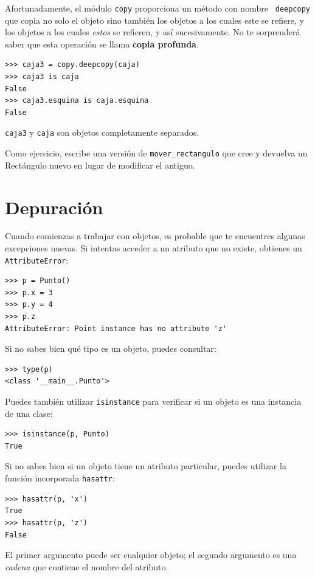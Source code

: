 \documentclass[10pt]{book}
\begin{document}
Afortunadamente, el módulo {\tt copy} proporciona un método con nombre {\tt
deepcopy} que copia no solo el objeto sino también
los objetos a los cuales este se refiere, y los objetos a los cuales {\em estos} se refieren,
y así sucesivamente.
No te sorprenderá saber que esta operación se
llama {\bf copia profunda}.

\begin{verbatim}
>>> caja3 = copy.deepcopy(caja)
>>> caja3 is caja
False
>>> caja3.esquina is caja.esquina
False
\end{verbatim}
%
{\tt caja3} y {\tt caja} son objetos completamente separados.

Como ejercicio, escribe una versión de \verb"mover_rectangulo" que cree y
devuelva un Rectángulo nuevo en lugar de modificar el antiguo.


\section{Depuración}
\label{hasattr}

Cuando comienzas a trabajar con objetos, es probable que te encuentres
algunas excepciones nuevas.  Si intentas acceder a un atributo
que no existe, obtienes un {\tt AttributeError}:

\begin{verbatim}
>>> p = Punto()
>>> p.x = 3
>>> p.y = 4
>>> p.z
AttributeError: Point instance has no attribute 'z'
\end{verbatim}
%
Si no sabes bien qué tipo es un objeto, puedes consultar:

\begin{verbatim}
>>> type(p)
<class '__main__.Punto'>
\end{verbatim}
%
Puedes también utilizar {\tt isinstance} para verificar si un objeto
es una instancia de una clase:

\begin{verbatim}
>>> isinstance(p, Punto)
True
\end{verbatim}
%
Si no sabes bien si un objeto tiene un atributo particular,
puedes utilizar la función incorporada {\tt hasattr}:

\begin{verbatim}
>>> hasattr(p, 'x')
True
>>> hasattr(p, 'z')
False
\end{verbatim}
%
El primer argumento puede ser cualquier objeto; el segundo argumento es una {\em
cadena} que contiene el nombre del atributo.
\end{document}
